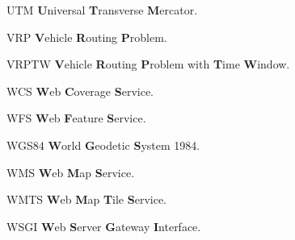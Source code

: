 \begin{abbreviations}
    \item[UTM] \textbf{U}niversal \textbf{T}ransverse \textbf{M}ercator.
    \item[VRP] \textbf{V}ehicle \textbf{R}outing \textbf{P}roblem.
    \item[VRPTW] \textbf{V}ehicle \textbf{R}outing \textbf{P}roblem with \textbf{T}ime \textbf{W}indow.
    \item[WCS] \textbf{W}eb \textbf{C}overage \textbf{S}ervice.
    \item[WFS] \textbf{W}eb \textbf{F}eature \textbf{S}ervice.
    \item[WGS84] \textbf{W}orld \textbf{G}eodetic \textbf{S}ystem 1984.
    \item[WMS] \textbf{W}eb \textbf{M}ap \textbf{S}ervice.
    \item[WMTS] \textbf{W}eb \textbf{M}ap \textbf{T}ile \textbf{S}ervice.
    \item[WSGI] \textbf{W}eb \textbf{S}erver \textbf{G}ateway \textbf{I}nterface.
\end{abbreviations}